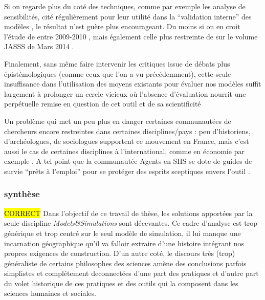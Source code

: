 Si on regarde plus du coté des techniques, comme par exemple les analyse de sensibilités, cité régulièrement pour leur utilité dans la \enquote{validation interne} des modèles \autocite{Amblard2006}, le résultat n'est guère plus encourageant. Du moins si on en croit l'étude de \textcite{Thiele2014} entre 2009-2010 , mais également celle plus restreinte de \textcite{Cottineau2015} sur le volume JASSS de Mars 2014 .

Finalement, sans même faire intervenir les critiques issue de débats plus épistémologiques (comme ceux que l'on a vu précédemment), cette seule insuffisance dans l'utilisation des moyens existants pour évaluer nos modèles suffit largement à prolonger un cercle vicieux où l'absence d'évaluation nourrit une perpétuelle remise en question de cet outil et de sa scientificité 

Un problème qui met un peu plus en danger certaines communautées de chercheurs encore restreintes dans certaines disciplines/pays : peu d'historiens, d'archéologues, de sociologues \autocite{Manzo2007} supportent ce mouvement en France, mais c'est aussi le cas de certaines disciplines à l'international, comme en économie par exemple \autocites{Lehtinen2007, Richiardi2006}[220]{Squazzoni2010}[198]{Fagiolo2007}. A tel point que la communautée Agents en SHS se dote de guides de survie \enquote{prêts à l'emploi} pour se protéger des esprits sceptiques envers l'outil \autocite{Waldherr2013}.

\subsubsection{synthèse}

\hl{CORRECT}
Dans l'objectif de ce travail de thèse, les solutions apportées par la seule discipline \textit{Models\&Simulations} sont décevantes. Ce cadre d'analyse est trop générique et trop centré sur le seul modèle de simulation, il lui manque une incarnation géographique qu'il va falloir extraire d'une histoire intégrant nos propres exigences de construction. D'un autre coté, le discours très (trop) généraliste de certains philosophes des sciences amène des conclusions parfois simplistes et complétement deconnectées d'une part des pratiques et d'autre part du volet historique de ces pratiques et des outils qui la composent dans les sciences humaines et sociales.

